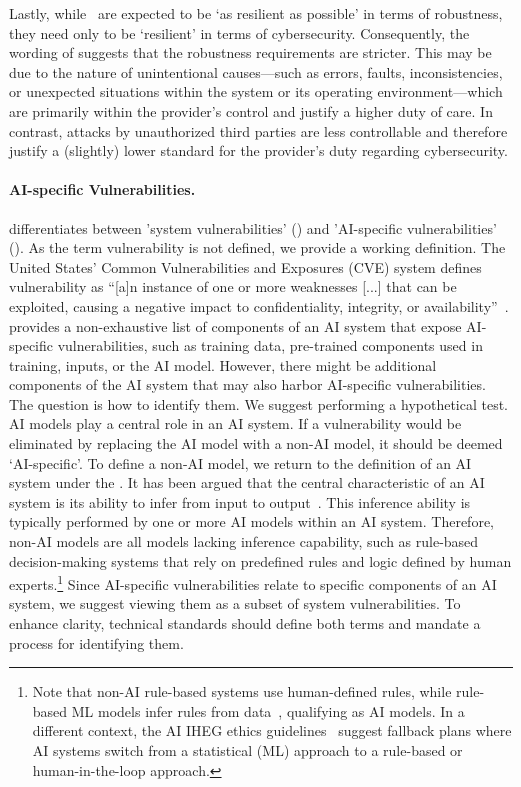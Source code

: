 Lastly, while \HRAIS\ are expected to be `as resilient as possible' in terms of robustness, they need only to be `resilient' in terms of cybersecurity. Consequently, the wording of  suggests that the robustness requirements are stricter. This may be due to the nature of unintentional causes—such as errors, faults, inconsistencies, or unexpected situations within the system or its operating environment—which are primarily within the provider’s control and justify a higher duty of care. In contrast, attacks by unauthorized third parties are less controllable and therefore justify a (slightly) lower standard for the provider’s duty regarding cybersecurity.


\paragraph{AI-specific Vulnerabilities.}
%
 differentiates between 'system vulnerabilities' () and 'AI-specific vulnerabilities' (). 
%
As the term vulnerability is not defined, 
%
we provide a working definition.
%
The United States' Common Vulnerabilities and Exposures (CVE) system defines vulnerability as ``[a]n instance of one or more weaknesses [...] that can be exploited, causing a negative impact to confidentiality, integrity, or availability''~\cite{cve_glossary}.
%
 provides a non-exhaustive list of components of an AI system that expose AI-specific vulnerabilities, such as training data, pre-trained components used in training, inputs, or the AI model.
% 
However, there might be additional components of the AI system that may also harbor AI-specific vulnerabilities. 
%
The question is how to identify them.
% 
We suggest performing a hypothetical test.
%
AI models play a central role in an AI system. If a vulnerability would be eliminated by replacing the AI model with a non-AI model, it should be deemed ‘AI-specific’. To define a non-AI model, 
%
we return to the definition of an AI system under the \EUAIAct.
% 
It has been argued that the central characteristic of an AI system is its ability to infer from input to output~\cite{hacker2024comments}. 
%
This inference ability is typically performed by one or more AI models within an AI system. 
%
Therefore, non-AI models are all models lacking inference capability, such as rule-based decision-making systems that rely on predefined rules and logic defined by human experts.\footnote{Note that non-AI rule-based systems use human-defined rules, while rule-based ML models infer rules from data~\cite{naik2023machine, weiss1995rule}, qualifying as AI models. In a different context, the AI IHEG ethics guidelines~\cite{aiiheg2019guidelines} suggest fallback plans where AI systems  switch from a statistical (ML) approach to a rule-based or human-in-the-loop approach.}
%
Since AI-specific vulnerabilities relate to specific components of an AI system, we suggest viewing them as a subset of system vulnerabilities. 
%
To enhance clarity, technical standards should define both terms and mandate a process for identifying them.



